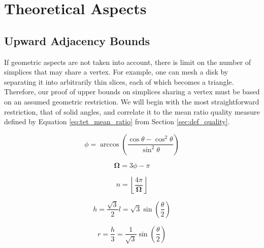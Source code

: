 
\appendix    %

\chapter{Theoretical Aspects}

\section{Upward Adjacency Bounds}

If geometric aspects are not taken into account, there
is limit on the number of simplices that may share a vertex.
For example, one can mesh a disk by separating it into arbitrarily
thin slices, each of which becomes a triangle.
Therefore, our proof of upper bounds on simplices sharing a vertex
must be based on an assumed geometric restriction.
We will begin with the most straightforward restriction, that
of solid angles, and correlate it to the mean ratio quality measure
defined by Equation \ref{eq:tet_mean_ratio} from Section \ref{sec:def_quality}.

\begin{equation}
\phi = \arccos\left(\frac{\cos\theta - \cos^2\theta}{\sin^2\theta}\right)
\end{equation}

\begin{equation}
\mathbf{\Omega} = 3\phi - \pi
\end{equation}

\begin{equation} \label{eq:solid_angle_degree}
n = \left\lfloor \frac{4\pi}{\mathbf{\Omega}} \right\rfloor
\end{equation}

\begin{equation} \label{eq:surf_tri_height}
h = \frac{\sqrt{3}}{2}l = \sqrt{3}\sin\left(\frac{\theta}{2}\right)
\end{equation}

\begin{equation} \label{eq:surf_tri_inradius}
r = \frac{h}{3} = \frac{1}{\sqrt{3}}\sin\left(\frac{\theta}{2}\right)
\end{equation}

